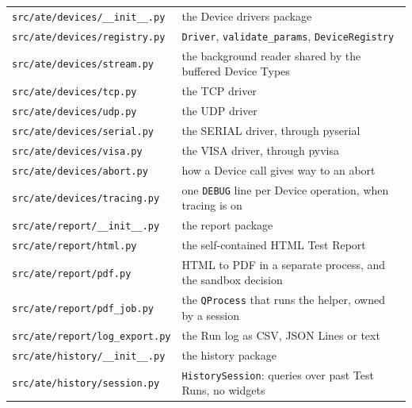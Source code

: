\begin{longtable}{p{5.6cm} p{9.4cm}}
\texttt{src/\allowbreak{}ate/\allowbreak{}devices/\allowbreak\_\allowbreak\_\allowbreak{}init\_\allowbreak\_\allowbreak.py} & the Device drivers package \\
\texttt{src/\allowbreak{}ate/\allowbreak{}devices/\allowbreak{}registry.py} & \texttt{Driver}, \texttt{validate\_params}, \texttt{DeviceRegistry} \\
\texttt{src/\allowbreak{}ate/\allowbreak{}devices/\allowbreak{}stream.py} & the background reader shared by the buffered Device Types \\
\texttt{src/\allowbreak{}ate/\allowbreak{}devices/\allowbreak{}tcp.py} & the TCP driver \\
\texttt{src/\allowbreak{}ate/\allowbreak{}devices/\allowbreak{}udp.py} & the UDP driver \\
\texttt{src/\allowbreak{}ate/\allowbreak{}devices/\allowbreak{}serial.py} & the SERIAL driver, through pyserial \\
\texttt{src/\allowbreak{}ate/\allowbreak{}devices/\allowbreak{}visa.py} & the VISA driver, through pyvisa \\
\texttt{src/\allowbreak{}ate/\allowbreak{}devices/\allowbreak{}abort.py} & how a Device call gives way to an abort \\
\texttt{src/\allowbreak{}ate/\allowbreak{}devices/\allowbreak{}tracing.py} & one \texttt{DEBUG} line per Device operation, when tracing is on \\
\texttt{src/\allowbreak{}ate/\allowbreak{}report/\allowbreak\_\allowbreak\_\allowbreak{}init\_\allowbreak\_\allowbreak.py} & the report package \\
\texttt{src/\allowbreak{}ate/\allowbreak{}report/\allowbreak{}html.py} & the self-contained HTML Test Report \\
\texttt{src/\allowbreak{}ate/\allowbreak{}report/\allowbreak{}pdf.py} & HTML to PDF in a separate process, and the sandbox decision \\
\texttt{src/\allowbreak{}ate/\allowbreak{}report/\allowbreak{}pdf\_\allowbreak{}job.py} & the \texttt{QProcess} that runs the helper, owned by a session \\
\texttt{src/\allowbreak{}ate/\allowbreak{}report/\allowbreak{}log\_\allowbreak{}export.py} & the Run log as CSV, JSON Lines or text \\
\texttt{src/\allowbreak{}ate/\allowbreak{}history/\allowbreak\_\allowbreak\_\allowbreak{}init\_\allowbreak\_\allowbreak.py} & the history package \\
\texttt{src/\allowbreak{}ate/\allowbreak{}history/\allowbreak{}session.py} & \texttt{HistorySession}: queries over past Test Runs, no widgets \\

\end{longtable}
